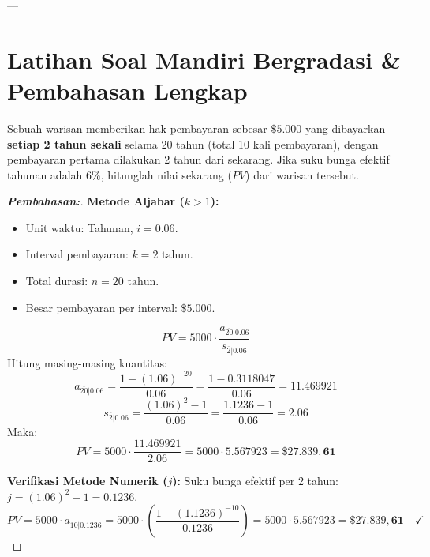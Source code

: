 \documentclass[11pt,a4paper]{article}
\begin{document}
---

\section{Latihan Soal Mandiri Bergradasi \& Pembahasan Lengkap}

\begin{examplebox}
Sebuah warisan memberikan hak pembayaran sebesar $\$5.000$ yang dibayarkan \textbf{setiap 2 tahun sekali} selama 20 tahun (total 10 kali pembayaran), dengan pembayaran pertama dilakukan 2 tahun dari sekarang. Jika suku bunga efektif tahunan adalah $6\%$, hitunglah nilai sekarang ($PV$) dari warisan tersebut.
\end{examplebox}

\begin{proof}[\textbf{Pembahasan:}]
\textbf{Metode Aljabar ($k > 1$):}
\begin{itemize}
    \item Unit waktu: Tahunan, $i = 0.06$.
    \item Interval pembayaran: $k = 2\text{ tahun}$.
    \item Total durasi: $n = 20\text{ tahun}$.
    \item Besar pembayaran per interval: $\$5.000$.
\end{itemize}
\begin{equation*}
    PV = 5000 \cdot \frac{a_{\overline{20}|0.06}}{s_{\overline{2}|0.06}}
\end{equation*}
Hitung masing-masing kuantitas:
\begin{equation*}
    a_{\overline{20}|0.06} = \frac{1 - (1.06)^{-20}}{0.06} = \frac{1 - 0.3118047}{0.06} = 11.469921
\end{equation*}
\begin{equation*}
    s_{\overline{2}|0.06} = \frac{(1.06)^2 - 1}{0.06} = \frac{1.1236 - 1}{0.06} = 2.06
\end{equation*}
Maka:
\begin{equation*}
    PV = 5000 \cdot \frac{11.469921}{2.06} = 5000 \cdot 5.567923 = \mathbf{\$27.839,61}
\end{equation*}

\textbf{Verifikasi Metode Numerik ($j$):}
Suku bunga efektif per 2 tahun: $j = (1.06)^2 - 1 = 0.1236$.
\begin{equation*}
    PV = 5000 \cdot a_{\overline{10}|0.1236} = 5000 \cdot \left( \frac{1 - (1.1236)^{-10}}{0.1236} \right) = 5000 \cdot 5.567923 = \mathbf{\$27.839,61} \quad \checkmark
\end{equation*}
\end{proof}
\end{document}
